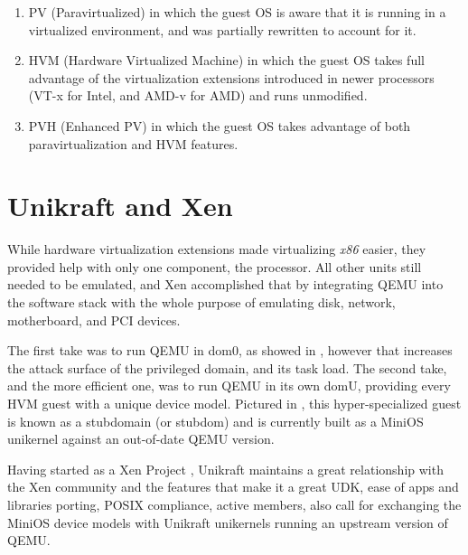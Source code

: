 \begin{enumerate}
  \item PV (Paravirtualized) in which the guest OS is aware that it is running in a virtualized environment, and was partially rewritten to account for it.
  \item HVM (Hardware Virtualized Machine) in which the guest OS takes full advantage of the virtualization extensions introduced in newer processors (VT-x for Intel, and AMD-v for AMD) and runs unmodified.
  \item PVH (Enhanced PV) in which the guest OS takes advantage of both paravirtualization and HVM features.
\end{enumerate}

\section{Unikraft and Xen}
\label{sec:unikraft-xen}

While hardware virtualization extensions made virtualizing \textit{x86} easier, they provided help with only one component, the processor.
All other units still needed to be emulated, and Xen accomplished that by integrating QEMU into the software stack with the whole purpose of emulating disk, network, motherboard, and PCI devices.

The first take was to run QEMU in dom0, as showed in  , however that increases the attack surface of the privileged domain, and its task load.
The second take, and the more efficient one, was to run QEMU in its own domU, providing every HVM guest with a unique device model.
Pictured in , this hyper-specialized guest is known as a stubdomain (or stubdom) and is currently built as a MiniOS \cite{minios} unikernel against an out-of-date QEMU version.


Having started as a Xen Project \cite{unikraft-xen}, Unikraft maintains a great relationship with the Xen community and the features that make it a great UDK, ease of apps and libraries porting, POSIX compliance, active members, also call for exchanging the MiniOS device models with Unikraft unikernels running an upstream version of QEMU.

